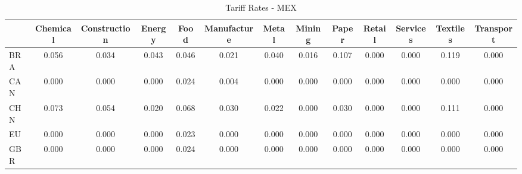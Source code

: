\begin{table}[htbp]
\centering
\caption{Tariff Rates - MEX} 
\label{tab:tariffs_MEX}
\begin{tabular}{lcccccccccccc}
  \hline
 & Chemical & Construction & Energy & Food & Manufacture & Metal & Mining & Paper & Retail & Services & Textiles & Transport \\ 
  \hline
BRA & \textcolor[RGB]{32,21,223}{0.056} & \textcolor[RGB]{49,32,206}{0.034} & \textcolor[RGB]{38,25,217}{0.043} & \textcolor[RGB]{36,23,219}{0.046} & \textcolor[RGB]{72,47,183}{0.021} & \textcolor[RGB]{40,26,215}{0.040} & \textcolor[RGB]{81,52,174}{0.016} & \textcolor[RGB]{11,7,244}{0.107} & \textcolor[RGB]{255,165,0}{0.000} & \textcolor[RGB]{255,165,0}{0.000} & \textcolor[RGB]{4,3,251}{0.119} & \textcolor[RGB]{255,165,0}{0.000} \\ 
  CAN & \textcolor[RGB]{255,165,0}{0.000} & \textcolor[RGB]{255,165,0}{0.000} & \textcolor[RGB]{255,165,0}{0.000} & \textcolor[RGB]{62,40,193}{0.024} & \textcolor[RGB]{102,66,153}{0.004} & \textcolor[RGB]{255,165,0}{0.000} & \textcolor[RGB]{255,165,0}{0.000} & \textcolor[RGB]{255,165,0}{0.000} & \textcolor[RGB]{255,165,0}{0.000} & \textcolor[RGB]{255,165,0}{0.000} & \textcolor[RGB]{255,165,0}{0.000} & \textcolor[RGB]{255,165,0}{0.000} \\ 
  CHN & \textcolor[RGB]{21,14,234}{0.073} & \textcolor[RGB]{34,22,221}{0.054} & \textcolor[RGB]{77,50,178}{0.020} & \textcolor[RGB]{25,16,230}{0.068} & \textcolor[RGB]{53,34,202}{0.030} & \textcolor[RGB]{70,45,185}{0.022} & \textcolor[RGB]{255,165,0}{0.000} & \textcolor[RGB]{51,33,204}{0.030} & \textcolor[RGB]{255,165,0}{0.000} & \textcolor[RGB]{255,165,0}{0.000} & \textcolor[RGB]{8,5,246}{0.111} & \textcolor[RGB]{255,165,0}{0.000} \\ 
  EU & \textcolor[RGB]{110,72,144}{0.000} & \textcolor[RGB]{255,165,0}{0.000} & \textcolor[RGB]{255,165,0}{0.000} & \textcolor[RGB]{66,43,189}{0.023} & \textcolor[RGB]{255,165,0}{0.000} & \textcolor[RGB]{255,165,0}{0.000} & \textcolor[RGB]{255,165,0}{0.000} & \textcolor[RGB]{255,165,0}{0.000} & \textcolor[RGB]{255,165,0}{0.000} & \textcolor[RGB]{255,165,0}{0.000} & \textcolor[RGB]{255,165,0}{0.000} & \textcolor[RGB]{255,165,0}{0.000} \\ 
  GBR & \textcolor[RGB]{108,70,147}{0.000} & \textcolor[RGB]{255,165,0}{0.000} & \textcolor[RGB]{255,165,0}{0.000} & \textcolor[RGB]{64,41,191}{0.024} & \textcolor[RGB]{255,165,0}{0.000} & \textcolor[RGB]{255,165,0}{0.000} & \textcolor[RGB]{255,165,0}{0.000} & \textcolor[RGB]{255,165,0}{0.000} & \textcolor[RGB]{255,165,0}{0.000} & \textcolor[RGB]{255,165,0}{0.000} & \textcolor[RGB]{255,165,0}{0.000} & \textcolor[RGB]{255,165,0}{0.000} \\ 

\end{tabular}
\end{table}
